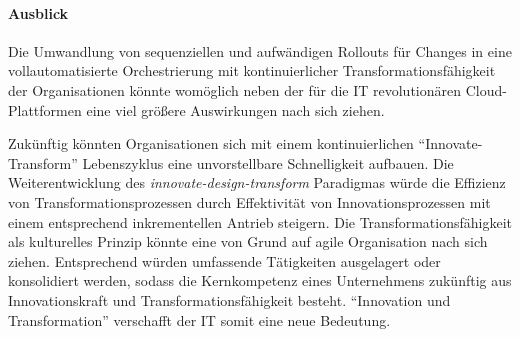 \newpage
\paragraph{Ausblick}


Die Umwandlung von sequenziellen und aufwändigen Rollouts für Changes in eine vollautomatisierte Orchestrierung mit kontinuierlicher Transformationsfähigkeit der Organisationen könnte womöglich neben der für die IT revolutionären Cloud-Plattformen eine viel größere Auswirkungen nach sich ziehen. 

Zukünftig könnten Organisationen sich mit einem kontinuierlichen \enquote{Innovate-Transform} Lebenszyklus eine unvorstellbare Schnelligkeit aufbauen.
Die Weiterentwicklung des \emph{innovate-design-transform} Paradigmas würde die Effizienz von Transformationsprozessen durch Effektivität von Innovationsprozessen mit einem entsprechend inkrementellen Antrieb steigern. Die Transformationsfähigkeit als kulturelles Prinzip könnte eine von Grund auf agile Organisation nach sich ziehen. Entsprechend würden umfassende Tätigkeiten ausgelagert oder konsolidiert werden, sodass die Kernkompetenz eines Unternehmens zukünftig aus Innovationskraft und Transformationsfähigkeit besteht. \enquote{Innovation und Transformation} verschafft der IT somit eine neue Bedeutung.